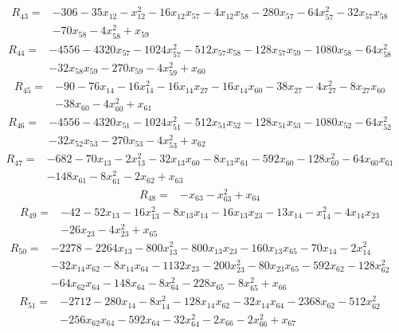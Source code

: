 \[\begin{aligned}R_{43}={}&-306-35x_{12}-x_{12}^{2}-16x_{12}x_{57}-4x_{12}x_{58}-280x_{57}-64x_{57}^{2}-32x_{57}x_{58}
\\&-70x_{58}-4x_{58}^{2}+x_{59}
\end{aligned}\]
\[\begin{aligned}R_{44}={}&-4556-4320x_{57}-1024x_{57}^{2}-512x_{57}x_{58}-128x_{57}x_{59}-1080x_{58}-64x_{58}^{2}
\\&-32x_{58}x_{59}-270x_{59}-4x_{59}^{2}+x_{60}
\end{aligned}\]
\[\begin{aligned}R_{45}={}&-90-76x_{14}-16x_{14}^{2}-16x_{14}x_{27}-16x_{14}x_{60}-38x_{27}-4x_{27}^{2}-8x_{27}x_{60}
\\&-38x_{60}-4x_{60}^{2}+x_{61}
\end{aligned}\]
\[\begin{aligned}R_{46}={}&-4556-4320x_{51}-1024x_{51}^{2}-512x_{51}x_{52}-128x_{51}x_{53}-1080x_{52}-64x_{52}^{2}
\\&-32x_{52}x_{53}-270x_{53}-4x_{53}^{2}+x_{62}
\end{aligned}\]
\[\begin{aligned}R_{47}={}&-682-70x_{13}-2x_{13}^{2}-32x_{13}x_{60}-8x_{13}x_{61}-592x_{60}-128x_{60}^{2}-64x_{60}x_{61}
\\&-148x_{61}-8x_{61}^{2}-2x_{62}+x_{63}
\end{aligned}\]
\[\begin{aligned}R_{48}={}&-x_{63}-x_{63}^{2}+x_{64}
\end{aligned}\]
\[\begin{aligned}R_{49}={}&-42-52x_{13}-16x_{13}^{2}-8x_{13}x_{14}-16x_{13}x_{23}-13x_{14}-x_{14}^{2}-4x_{14}x_{23}
\\&-26x_{23}-4x_{23}^{2}+x_{65}
\end{aligned}\]
\[\begin{aligned}R_{50}={}&-2278-2264x_{13}-800x_{13}^{2}-800x_{13}x_{23}-160x_{13}x_{65}-70x_{14}-2x_{14}^{2}
\\&-32x_{14}x_{62}-8x_{14}x_{64}-1132x_{23}-200x_{23}^{2}-80x_{23}x_{65}-592x_{62}-128x_{62}^{2}
\\&-64x_{62}x_{64}-148x_{64}-8x_{64}^{2}-228x_{65}-8x_{65}^{2}+x_{66}
\end{aligned}\]
\[\begin{aligned}R_{51}={}&-2712-280x_{14}-8x_{14}^{2}-128x_{14}x_{62}-32x_{14}x_{64}-2368x_{62}-512x_{62}^{2}
\\&-256x_{62}x_{64}-592x_{64}-32x_{64}^{2}-2x_{66}-2x_{66}^{2}+x_{67}
\end{aligned}\]
